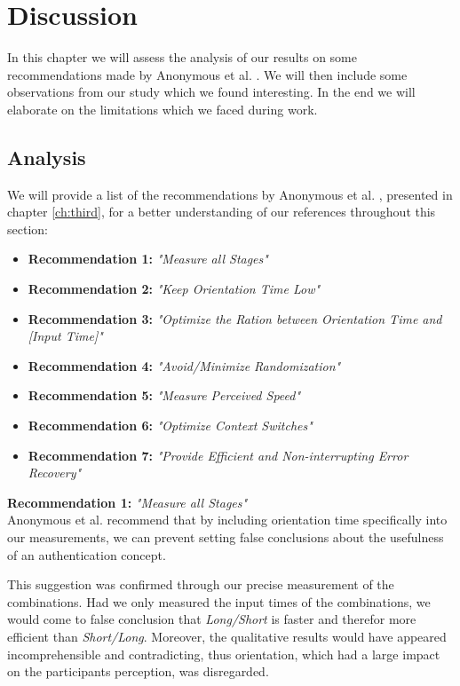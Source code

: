 
\chapter{Discussion}\label{ch:sixth}

In this chapter we will assess the analysis of our results on some recommendations made by Anonymous et al. \cite{anonymous}. We will then include some observations from our study which we found interesting. In the end we will elaborate on the limitations which we faced during work.

\section{Analysis}

We will provide a list of the recommendations by Anonymous et al. \cite{anonymous}, presented in chapter \ref{ch:third}, for a better understanding of our references throughout this section: 

\begin{itemize}
    \item \textbf{Recommendation 1:} \textit{"Measure all Stages"}
    \item \textbf{Recommendation 2:} \textit{"Keep Orientation Time Low"}
    \item \textbf{Recommendation 3:} \textit{"Optimize the Ration between Orientation Time and [Input Time]"} 
    \item \textbf{Recommendation 4:} \textit{"Avoid/Minimize Randomization"}
    \item \textbf{Recommendation 5:} \textit{"Measure Perceived Speed"}
    \item \textbf{Recommendation 6:} \textit{"Optimize Context Switches"}
    \item \textbf{Recommendation 7:} \textit{"Provide Efficient and Non-interrupting Error Recovery"}
\end{itemize}



\textbf{Recommendation 1:} \textit{"Measure all Stages"}\\
Anonymous et al. \cite{anonymous} recommend that by including orientation time specifically into our measurements, we can prevent setting false conclusions about the usefulness of an authentication concept. 

This suggestion was confirmed through our precise measurement of the combinations. Had we only measured the input times of the combinations, we would come to false conclusion that \textit{Long/Short} is faster and therefor more efficient than \textit{Short/Long}. Moreover, the qualitative results would have appeared incomprehensible and contradicting, thus orientation, which had a large impact on the participants perception, was disregarded. \\

